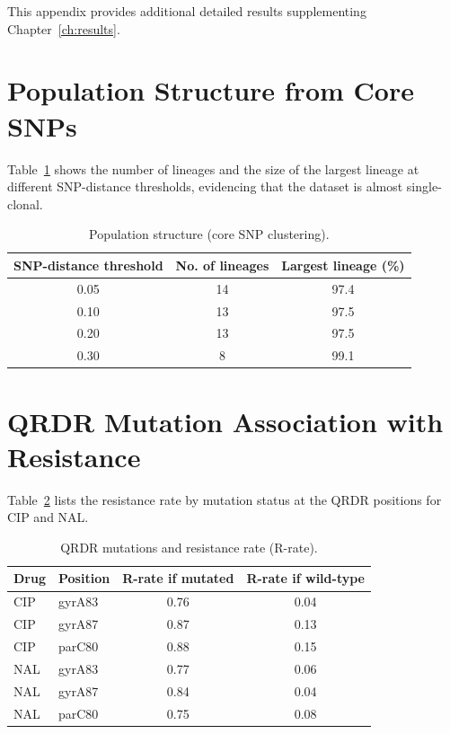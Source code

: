 \documentclass[../main.tex]{subfiles}
\begin{document}
This appendix provides additional detailed results supplementing Chapter~\ref{ch:results}.

\section{Population Structure from Core SNPs}

Table~\ref{tab:popstruct} shows the number of lineages and the size of the largest lineage at different SNP-distance thresholds, evidencing that the dataset is almost single-clonal.

\begin{table}[H]
\centering
\caption{Population structure (core SNP clustering).}
\label{tab:popstruct}
\begin{tabular}{ccc}
\hline
SNP-distance threshold & No. of lineages & Largest lineage (\%) \\ \hline
0.05 & 14 & 97.4 \\
0.10 & 13 & 97.5 \\
0.20 & 13 & 97.5 \\
0.30 & 8  & 99.1 \\ \hline
\end{tabular}
\end{table}

\section{QRDR Mutation Association with Resistance}

Table~\ref{tab:qrdr} lists the resistance rate by mutation status at the QRDR positions for CIP and NAL.

\begin{table}[H]
\centering
\caption{QRDR mutations and resistance rate (R-rate).}
\label{tab:qrdr}
\begin{tabular}{llcc}
\hline
Drug & Position & R-rate if mutated & R-rate if wild-type \\ \hline
CIP & gyrA83 & 0.76 & 0.04 \\
CIP & gyrA87 & 0.87 & 0.13 \\
CIP & parC80 & 0.88 & 0.15 \\
NAL & gyrA83 & 0.77 & 0.06 \\
NAL & gyrA87 & 0.84 & 0.04 \\
NAL & parC80 & 0.75 & 0.08 \\ \hline
\end{tabular}
\end{table}
\end{document}
